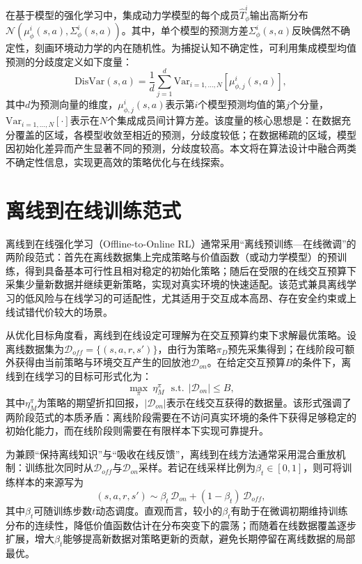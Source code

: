 在基于模型的强化学习中，集成动力学模型的每个成员$\hat{T}_{\phi}^i$输出高斯分布$\mathcal{N}(\mu_{\phi}^i(s,a), \Sigma_{\phi}^i(s,a))$。其中，单个模型的预测方差$\Sigma_\phi^i(s,a)$反映偶然不确定性，刻画环境动力学的内在随机性。为捕捉认知不确定性，可利用集成模型均值预测的分歧度定义如下度量：
\begin{equation}\label{Eq:Chap2_disvar}
  \text{DisVar}(s,a) = \frac{1}{d}\sum_{j=1}^d \text{Var}_{i=1,\ldots,N}[\mu_{\phi,j}^i(s,a)],
\end{equation}
其中$d$为预测向量的维度，$\mu_{\phi,j}^i(s,a)$表示第$i$个模型预测均值的第$j$个分量，$\text{Var}_{i=1,\ldots,N}[\cdot]$表示在$N$个集成成员间计算方差。该度量的核心思想是：在数据充分覆盖的区域，各模型收敛至相近的预测，分歧度较低；在数据稀疏的区域，模型因初始化差异而产生显著不同的预测，分歧度较高。本文将在算法设计中融合两类不确定性信息，实现更高效的策略优化与在线探索。



\section{离线到在线训练范式}\label{Sec2.4}

离线到在线强化学习（Offline-to-Online RL）通常采用“离线预训练—在线微调”的两阶段范式：首先在离线数据集上完成策略与价值函数（或动力学模型）的预训练，得到具备基本可行性且相对稳定的初始化策略；随后在受限的在线交互预算下采集少量新数据并继续更新策略，实现对真实环境的快速适配\cite{Lee2022O2O,Song2023HybridRL}。该范式兼具离线学习的低风险与在线学习的可适配性，尤其适用于交互成本高昂、存在安全约束或上线试错代价较大的场景。

从优化目标角度看，离线到在线设定可理解为在交互预算约束下求解最优策略。设离线数据集为$\mathcal{D}_{off}=\{(s,a,r,s')\}$，由行为策略$\pi_D$预先采集得到；在线阶段可额外获得由当前策略与环境交互产生的回放池$\mathcal{D}_{on}$。在给定交互预算$B$的条件下，离线到在线学习的目标可形式化为：
\begin{equation}\label{Eq:Chap2_o2o_budget}
  \max_{\pi}\ \eta_M^{\pi}\ \ \ \text{s.t.}\ \ |\mathcal{D}_{on}| \le B,
\end{equation}
其中$\eta_M^{\pi}$为策略的期望折扣回报，$|\mathcal{D}_{on}|$表示在线交互获得的数据量。该形式强调了两阶段范式的本质矛盾：离线阶段需要在不访问真实环境的条件下获得足够稳定的初始化能力，而在线阶段则需要在有限样本下实现可靠提升。

为兼顾“保持离线知识”与“吸收在线反馈”，离线到在线方法通常采用混合重放机制：训练批次同时从$\mathcal{D}_{off}$与$\mathcal{D}_{on}$采样\cite{Lee2022O2O,Zhao2023E2O}。若记在线采样比例为$\beta_t \in [0,1]$，则可将训练样本的来源写为
\begin{equation}\label{Eq:Chap2_mixed_replay}
  (s,a,r,s') \sim \beta_t\,\mathcal{D}_{on} + (1-\beta_t)\,\mathcal{D}_{off},
\end{equation}
其中$\beta_t$可随训练步数$t$动态调度。直观而言，较小的$\beta_t$有助于在微调初期维持训练分布的连续性，降低价值函数估计在分布突变下的震荡；而随着在线数据覆盖逐步扩展，增大$\beta_t$能够提高新数据对策略更新的贡献，避免长期停留在离线数据的局部最优。

